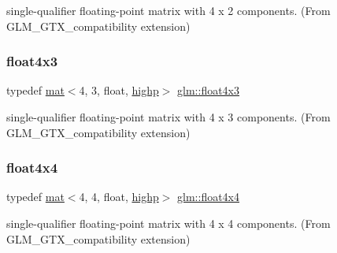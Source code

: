 single-\/qualifier floating-\/point matrix with 4 x 2 components. (From G\+L\+M\+\_\+\+G\+T\+X\+\_\+compatibility extension) 

\mbox{\label{group__gtx__compatibility_ga656a2d21cf92696b10063da4f431eecd}} 
\subsubsection{\texorpdfstring{float4x3}{float4x3}}
{\footnotesize\ttfamily typedef \mbox{\hyperlink{structglm_1_1mat}{mat}}$<$4, 3, float, \mbox{\hyperlink{namespaceglm_a36ed105b07c7746804d7fdc7cc90ff25ac6f7eab42eacbb10d59a58e95e362074}{highp}}$>$ \mbox{\hyperlink{group__gtx__compatibility_ga656a2d21cf92696b10063da4f431eecd}{glm\+::float4x3}}}



single-\/qualifier floating-\/point matrix with 4 x 3 components. (From G\+L\+M\+\_\+\+G\+T\+X\+\_\+compatibility extension) 

\mbox{\label{group__gtx__compatibility_ga32ecd052006dea588730d2a077c5896c}} 
\subsubsection{\texorpdfstring{float4x4}{float4x4}}
{\footnotesize\ttfamily typedef \mbox{\hyperlink{structglm_1_1mat}{mat}}$<$4, 4, float, \mbox{\hyperlink{namespaceglm_a36ed105b07c7746804d7fdc7cc90ff25ac6f7eab42eacbb10d59a58e95e362074}{highp}}$>$ \mbox{\hyperlink{group__gtx__compatibility_ga32ecd052006dea588730d2a077c5896c}{glm\+::float4x4}}}



single-\/qualifier floating-\/point matrix with 4 x 4 components. (From G\+L\+M\+\_\+\+G\+T\+X\+\_\+compatibility extension) 

\mbox{\label{group__gtx__compatibility_gaba41d7803e4b24c17656d74377b88286}} 
